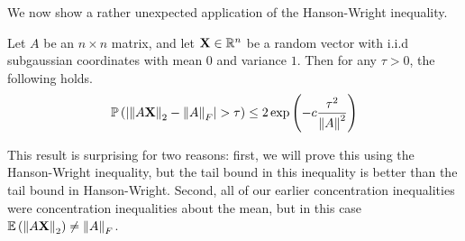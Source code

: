 \documentclass[11pt]{article}
\begin{document}
We now show a rather unexpected application of the Hanson-Wright inequality.
\begin{theorem}
 Let $A$ be an $n \times n$ matrix, and let $\mathbf{X} \in \mathbb{R}^n$ be a random vector with i.i.d subgaussian coordinates with mean $0$ and variance $1$.
 Then for any $\tau > 0$, the following holds.
 \begin{align*}
   \mathbb{P}\left( \left| \left\lVert A \mathbf{X}\right\rVert_2 - \left\lVert A\right\rVert_F \right| > \tau \right)
   \leq 2 \exp\left( -c \frac{\tau^2}{\left\lVert A\right\rVert^2} \right)
 \end{align*}
\end{theorem}
\begin{remark}
  This result is surprising for two reasons: first, we will prove this using the Hanson-Wright inequality, but the tail bound in this inequality is better than the tail bound in Hanson-Wright. Second, all of our earlier concentration inequalities were concentration inequalities about the mean, but in this case $\mathbb{E}\left( \left\lVert A \mathbf{X}\right\rVert_2 \right) \neq \left\lVert A\right\rVert_F$.
\end{remark}
\end{document}
